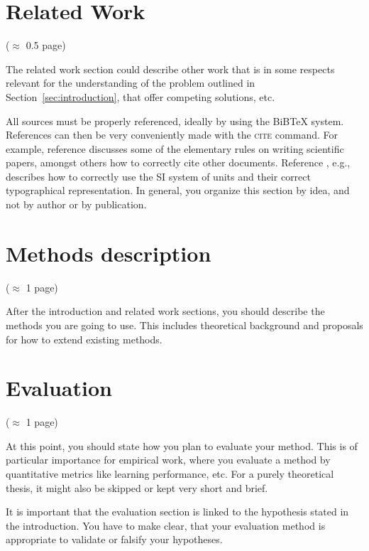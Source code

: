 \documentclass[12pt]{article}
\theoremstyle{plain}
\theoremstyle{definition}
\theoremstyle{remark}
\begin{document}
\section{Related Work}
\label{sec:relwork}
($\approx$ 0.5 page) 

The related work section could describe other work that is in some respects relevant for the understanding of the problem outlined in Section~\ref{sec:introduction}, that offer competing solutions, etc.

All sources must be properly referenced, ideally by using the BiBTeX system. References can then be very conveniently made with the \textsc{cite} command. For example, reference
\cite{Leunen:Scholars:92} discusses some of the elementary rules on
writing scientific papers, amongst others how to correctly cite other
documents. Reference \cite{Taylor:SIGuide:95}, e.g., describes how to
correctly use the SI system of units and their correct typographical
representation. In general, you organize this section by idea, and not by author or by publication.

\section{Methods description}
\label{sec:model}
($\approx$ 1 page) 

After the introduction and related work sections, you should describe the methods you are going to use. This includes theoretical background and proposals for how to extend existing methods. 


\section{Evaluation}
\label{sec:analysis}
($\approx$ 1 page) 

At this point, you should state how you plan to evaluate your method. This is of particular importance for empirical work, where you evaluate a method by quantitative metrics like learning performance, etc. For a purely theoretical thesis, it might also be skipped or kept very short and brief.  

It is important that the evaluation section is linked to the hypothesis stated in the introduction. You have to make clear, that your evaluation method is appropriate to validate or falsify your hypotheses. 

\end{document}
